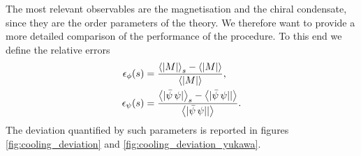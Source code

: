 \newpage
The most relevant observables are the magnetisation and the chiral condensate, since they are the order parameters of the theory. We therefore want to provide a more detailed comparison of the performance of the procedure. To this end we define the relative errors
\begin{equation}
    \begin{aligned}
        \epsilon_\phi(s) &= \frac{\left\langle |M| \right\rangle_{s} - \left\langle |M| \right\rangle}{\left\langle |M| \right\rangle}, \\
        \epsilon_\psi(s) &= \frac{\left\langle |\bar\psi \, \psi| \right\rangle_{s} - \left\langle |\bar\psi \, \psi|| \right\rangle}{\left\langle |\bar\psi \, \psi|| \right\rangle}.
    \end{aligned}
    \label{eq:cooling_relative_deviation}
\end{equation}
The deviation quantified by such parameters is reported in figures \ref{fig:cooling_deviation} and \ref{fig:cooling_deviation_yukawa}.
